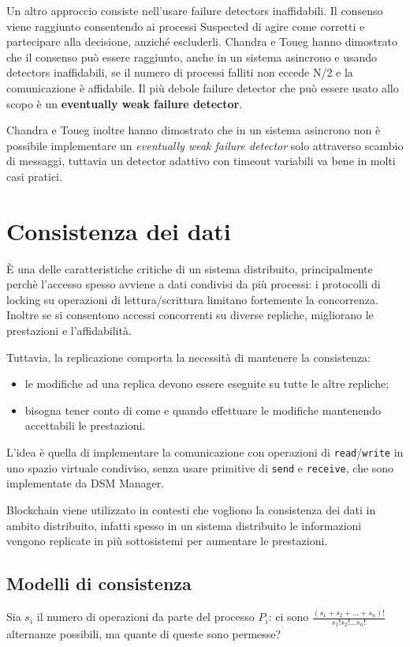 \vspace{5mm}

Un altro approccio consiste nell'usare failure detectors inaffidabili. Il consenso viene raggiunto consentendo ai processi Suspected di agire come corretti e partecipare alla decisione, anziché escluderli. Chandra e Toueg hanno dimostrato che il consenso può essere raggiunto, anche in un sistema asincrono e usando detectors inaffidabili, se il numero di processi falliti non eccede N/2 e la comunicazione è affidabile. Il più debole failure detector che può essere usato allo scopo è un \textbf{eventually weak failure detector}.

Chandra e Toueg inoltre hanno dimostrato che in un sistema asincrono non è possibile implementare un \textit{eventually weak failure detector} solo attraverso scambio di messaggi, tuttavia un detector adattivo con timeout variabili va bene in molti casi pratici.

\section{Consistenza dei dati}
È una delle caratteristiche critiche di un sistema distribuito, principalmente perchè l'accesso spesso avviene a dati condivisi da più processi: i protocolli di locking su operazioni di lettura/scrittura limitano fortemente la concorrenza. Inoltre se si consentono accessi concorrenti su diverse repliche, migliorano le prestazioni e l'affidabilità.

Tuttavia, la replicazione comporta la necessità di mantenere la consistenza:
\begin{itemize}
    \item le modifiche ad una replica devono essere eseguite su tutte le altre repliche;
    \item bisogna tener conto di come e quando effettuare le modifiche mantenendo accettabili le prestazioni.
\end{itemize}
L'idea è quella di implementare la comunicazione con operazioni di \texttt{read}/\texttt{write} in uno spazio virtuale condiviso, senza usare primitive di \texttt{send} e \texttt{receive}, che sono implementate da DSM Manager.

Blockchain viene utilizzato in contesti che vogliono la consistenza dei dati in ambito distribuito, infatti spesso in un sistema distribuito le informazioni vengono replicate in più sottosistemi per aumentare le prestazioni. 

\subsection{Modelli di consistenza}
Sia $s_{i}$ il numero di operazioni da parte del processo $P_{i}$:
ci sono $\frac{(s_{1} + s_{2} + ... + s_{n})!}{s_{1}! s_{2}! ... s_{n}!}$ alternanze possibili, ma quante di queste sono permesse?

